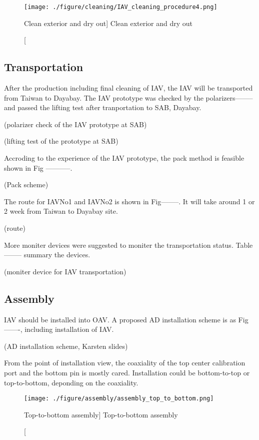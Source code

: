 \begin{figure}
    \centering
    \texttt{[image: ./figure/cleaning/IAV\_cleaning\_procedure4.png]}
    \caption
    [Clean exterior and dry out]
    {Clean exterior and dry out}
    \label{fig:IAV_cleaning_procedure4.png}
    \end{figure}


\subsection {Transportation}

After the production including final cleaning of IAV, the IAV will be
transported from Taiwan to Dayabay.
The IAV prototype was checked by the polarizers-------- and passed
the lifting test after tranportation to SAB, Dayabay.


(polarizer check of the IAV prototype at SAB)




(lifting test of the prototype at SAB)


Accroding to the experience of the IAV
prototype, the pack method is feasible shown in Fig -----------.


(Pack scheme)


The route for IAVNo1 and IAVNo2 is shown in Fig--------.
It will take around 1 or 2 week from Taiwan to Dayabay site.


(route)


More moniter devices were suggested to moniter the transportation
status. Table-------- summary the devices.


(moniter device for IAV transportation)


\subsection {Assembly}
\label {sec:assembly}

IAV should be installed into OAV. A proposed AD installation
scheme is as Fig-------, including installation of IAV.


(AD installation scheme, Karsten slides)


From the point of installation view, the coaxiality of the top center calibration port and
the bottom pin is mostly cared. Installation could be bottom-to-top or top-to-bottom, deponding
on the coaxiality.







\begin{figure}
    \centering
    \texttt{[image: ./figure/assembly/assembly\_top\_to\_bottom.png]}
    \caption
    [Top-to-bottom assembly]
    {Top-to-bottom assembly}
    \label{fig:assembly_top_to_bottom.png}
    \end{figure}


